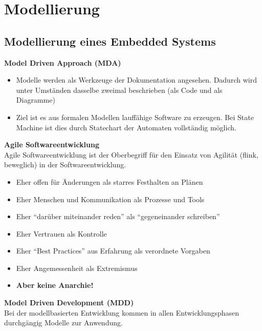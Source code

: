 \section{Modellierung}
\subsection{Modellierung eines Embedded Systems}

\textbf{Model Driven Approach (MDA)}
\begin{itemize}
	\item Modelle werden als Werkzeuge der Dokumentation angesehen. Dadurch wird unter Umständen dasselbe zweimal beschrieben (als Code und als Diagramme)
	
	\item Ziel ist es aus formalen Modellen lauffähige Software zu erzeugen. Bei State Machine ist dies durch Statechart der Automaten vollständig möglich.
\end{itemize}

\textbf{Agile Softwareentwicklung}\\
Agile Softwareentwicklung ist der Oberbegriff für den Einsatz von Agilität (flink, beweglich) in der Softwareentwicklung.
\begin{itemize}
	\item Eher offen für Änderungen als starres Festhalten an Plänen
	\item Eher Menschen und Kommunikation als Prozesse und Tools
	\item Eher "`darüber miteinander reden"' als "`gegeneinander schreiben"'
	\item Eher Vertrauen als Kontrolle
	\item Eher "`Best Practices"' aus Erfahrung als verordnete Vorgaben
	\item Eher Angemessenheit als Extremismus
	\item \textbf{Aber keine Anarchie!}
\end{itemize} 


\textbf{Model Driven Development (MDD)}\\
Bei der modellbasierten Entwicklung kommen in allen Entwicklungsphasen durchgängig Modelle zur Anwendung.

